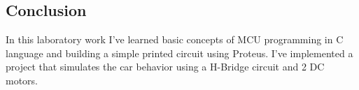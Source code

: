 \subsection*{Conclusion}
In this laboratory work I've learned basic concepts of MCU
programming in C language and building a simple printed circuit using Proteus. I've implemented a project that simulates the car behavior using a H-Bridge circuit and 2 DC motors.

